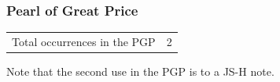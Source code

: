 	\subsubsection{Pearl of Great Price} %
		\label{COMPREHEND-PGP}
	
		\begin{tabular}{ll}
			Total occurrences in the PGP & 2
		\end{tabular}
		
		Note that the second use in the PGP is to a JS-H note.
		
		\begin{compactdesc}
			\item[{\hyperref[ABRAHAM-4-4]{Abraham 4:4}}]
		\end{compactdesc}
		

	


	
